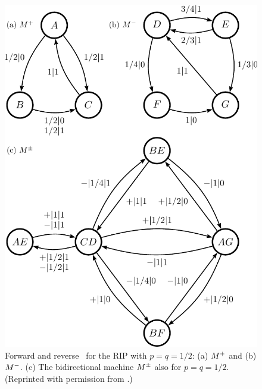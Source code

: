 \begin{figure}[th]
\centering
\includegraphics[scale=\figscale]{RIP}
\caption{
  Forward and reverse \eMs\ for the RIP with $p=q=1/2$: (a) ${M}^{+}$ and
  (b) ${M}^{-}$. (c) The bidirectional machine ${M}^{\pm}$ also for $p = q = 1/2$.
  (Reprinted with permission from \protect{}.)
  }
\label{fig:RIP}
\end{figure}

